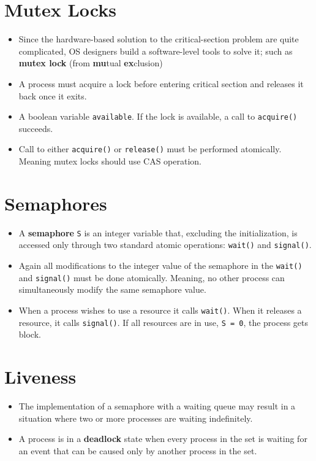 \documentclass{report}
\def\code#1{\texttt{#1}}
\begin{document}
\section{Mutex Locks}%

\begin{itemize}
  \item Since the hardware-based solution to the critical-section problem are quite complicated, OS designers
        build a software-level tools to solve it; such as \textbf{mutex lock} (from \textbf{mu}tual \textbf{ex}clusion)
  \item A process must acquire a lock before entering critical section and releases it back once it exits.
  \item A boolean variable \code{available}. If the lock is available, a call to \code{acquire()} succeeds.
  \item Call to either \code{acquire()} or \code{release()} must be performed atomically.
        Meaning mutex locks should use CAS operation.
\end{itemize}

\section{Semaphores}%
\begin{itemize}
  \item A \textbf{semaphore} \code{S} is an integer variable that, excluding the initialization, is accessed only through two
        standard atomic operations: \code{wait()} and \code{signal()}.
  \item Again all modifications to the integer value of the semaphore in the \code{wait()} and \code{signal()}
        must be done atomically. Meaning, no other process can simultaneously modify the same semaphore value.
  \item When a process wishes to use a resource it calls \code{wait()}. When it releases a resource, it calls
        \code{signal()}. If all resources are in use, \code{S = 0}, the process gets block.
\end{itemize}


\section{Liveness}%
\begin{itemize}
  \item The implementation of a semaphore with a waiting queue may result in a situation where two or more processes are
        waiting indefinitely.
  \item A process is in a \textbf{deadlock} state when every process in the set is waiting for an event that can be caused
        only by another process in the set.
\end{itemize}
\end{document}
